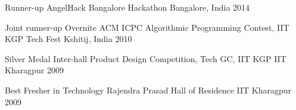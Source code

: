 



\begin{cvhonors}

  \cvhonor
    {Runner-up} %
    {AngelHack Bangalore Hackathon} %
    {Bangalore, India} %
    {2014} %
    
  \cvhonor
    {Joint runner-up} %
    {Overnite ACM ICPC Algorithmic Programming Contest, IIT KGP Tech Fest} %
    {Kshitij, India} %
    {2010} %

  \cvhonor
    {Silver Medal} %
    {Inter-hall Product Design Competition, Tech GC, IIT KGP} %
    {IIT Kharagpur} %
    {2009} %

  \cvhonor
    {Best Fresher in Technology} %
    {Rajendra Prasad Hall of Residence} %
    {IIT Kharagpur} %
    {2009} %

\end{cvhonors}





